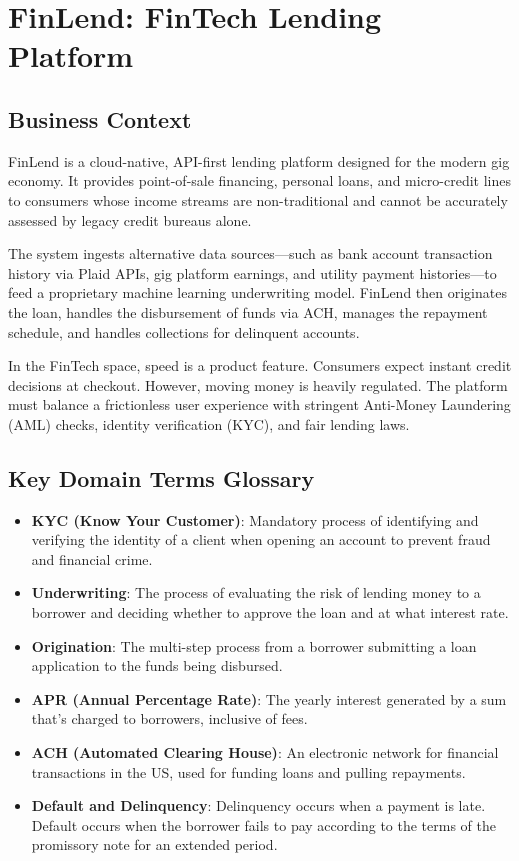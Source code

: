 \documentclass[
  11pt,
  openany,
  oneside]{book}
\providecommand{\tightlist}{%
  \setlength{\itemsep}{0pt}\setlength{\parskip}{0pt}}
\begin{document}
\bigskip

\section{FinLend: FinTech Lending
Platform}\label{finlend-fintech-lending-platform}

\subsection{Business Context}\label{business-context-1}

FinLend is a cloud-native, API-first lending platform designed for the
modern gig economy. It provides point-of-sale financing, personal loans,
and micro-credit lines to consumers whose income streams are
non-traditional and cannot be accurately assessed by legacy credit
bureaus alone.

The system ingests alternative data sources---such as bank account
transaction history via Plaid APIs, gig platform earnings, and utility
payment histories---to feed a proprietary machine learning underwriting
model. FinLend then originates the loan, handles the disbursement of
funds via ACH, manages the repayment schedule, and handles collections
for delinquent accounts.

In the FinTech space, speed is a product feature. Consumers expect
instant credit decisions at checkout. However, moving money is heavily
regulated. The platform must balance a frictionless user experience with
stringent Anti-Money Laundering (AML) checks, identity verification
(KYC), and fair lending laws.

\subsection{Key Domain Terms
Glossary}\label{key-domain-terms-glossary-1}

\begin{itemize}
\tightlist
\item
  \textbf{KYC (Know Your Customer)}: Mandatory process of identifying
  and verifying the identity of a client when opening an account to
  prevent fraud and financial crime.
\item
  \textbf{Underwriting}: The process of evaluating the risk of lending
  money to a borrower and deciding whether to approve the loan and at
  what interest rate.
\item
  \textbf{Origination}: The multi-step process from a borrower
  submitting a loan application to the funds being disbursed.
\item
  \textbf{APR (Annual Percentage Rate)}: The yearly interest generated
  by a sum that's charged to borrowers, inclusive of fees.
\item
  \textbf{ACH (Automated Clearing House)}: An electronic network for
  financial transactions in the US, used for funding loans and pulling
  repayments.
\item
  \textbf{Default and Delinquency}: Delinquency occurs when a payment is
  late. Default occurs when the borrower fails to pay according to the
  terms of the promissory note for an extended period.
\end{itemize}
\end{document}
